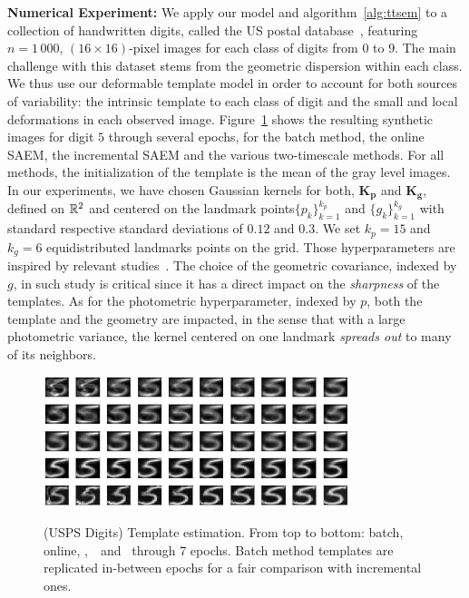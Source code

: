 \documentclass[conference,letterpaper]{IEEEtran}
\begin{document}
\vspace{0.08in}
\noindent \textbf{Numerical Experiment:} We apply our model and algorithm~\ref{alg:ttsem} to a collection of handwritten digits, called the US postal database~\cite{hull1994database}, featuring $n = 1\, 000$, $(16 \times 16)$-pixel images for each class of digits from $0$ to $9$.
The main challenge with this dataset stems from the geometric dispersion within each class.
We thus use our deformable template model in order to account for both sources of variability: the intrinsic template to each class of digit and the small and local deformations in each observed image.
Figure~\ref{fig:results} shows the resulting synthetic images for digit $5$ through several epochs, for the batch method, the online SAEM, the incremental SAEM and the various two-timescale methods.
For all methods, the initialization of the template is the mean of the gray level images.
In our experiments, we have chosen Gaussian kernels for both, $\mathbf{K}_{\mathbf{p}}$ and $\mathbf{K}_{\mathbf{g}}$, defined on $\mathbb{R}^2$ and centered on the landmark points$\{p_k\}_{k=1}^{k_p}$ and $\{g_k\}_{k=1}^{k_g}$ with standard respective standard deviations of $0.12$ and $0.3$. 
We set $k_p = 15$  and  $k_g = 6$ equidistributed landmarks points on the grid. 
Those hyperparameters are inspired by relevant studies~\cite{allassonniere2008stochastic,allassonniere2010construction}.
The choice of the geometric covariance, indexed by $g$, in such study is critical since it has a direct impact on the \emph{sharpness} of the templates.
As for the photometric hyperparameter, indexed by $p$, both the template and the geometry are impacted, in the sense that with a large photometric variance, the kernel centered on one landmark \emph{spreads out} to many of its neighbors.
\vspace{-0.1in}
\begin{figure}[H]
\begin{center}
\includegraphics[width=3.5in]{pic_paper/small}\vspace{-.2cm}
\caption{(USPS Digits) Template estimation. From top to bottom: batch, online, \ISAEM,\ \SAEMVR\ and \FISAEM\ through 7 epochs. 
Batch method templates are replicated in-between epochs for a fair comparison with incremental ones. }\vspace{-.2cm}
\label{fig:results}
\end{center}
\end{figure}
\end{document}
